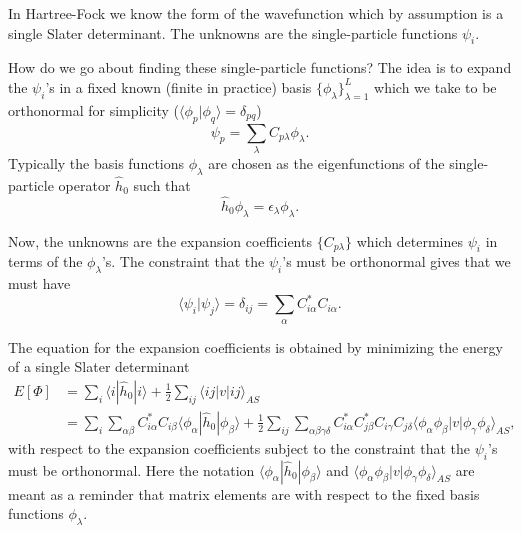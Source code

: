 \documentclass[a4paper,10pt]{article}
\newcommand{\braket}[1]{\langle#1\rangle}
\theoremstyle{definition}
\begin{document}
In Hartree-Fock we know the form of the wavefunction 
which by assumption is a single Slater determinant. The unknowns are the single-particle functions $\psi_i$.

How do we go about finding these single-particle functions? The idea is to expand the $\psi_i$'s in a fixed 
known (finite in practice) basis $\{ \phi_\lambda \}_{\lambda=1}^L$ which we take to be orthonormal for 
simplicity ($\braket{\phi_p|\phi_q} = \delta_{pq}$)
\begin{equation}
 \psi_p = \sum_\lambda C_{p \lambda} \phi_\lambda.
\end{equation}
Typically the basis functions $\phi_\lambda$ are chosen as the eigenfunctions of the single-particle operator $\hat{h}_0$
such that
\begin{equation}
 \hat{h}_0 \phi_\lambda = \epsilon_\lambda \phi_\lambda.
\end{equation}

Now, the unknowns are the expansion coefficients $\{ C_{p\lambda} \}$ which determines $\psi_i$ in terms of 
the $\phi_\lambda$'s. The constraint that the $\psi_i$'s must be orthonormal gives that we must have 
\begin{equation}
 \braket{\psi_i|\psi_j} = \delta_{ij} = \sum_{\alpha} C^*_{i\alpha} C_{i \alpha}. 	
\end{equation}

The equation for the expansion coefficients is obtained by minimizing the energy of a single Slater determinant
\begin{align*}
 E[\Phi] &= \sum_i \braket{i|\hat{h}_0|i} + \frac{1}{2} \sum_{ij} \braket{ij|v|ij}_{AS} \\
 &= \sum_i \sum_{\alpha \beta} C^*_{i \alpha}C_{i \beta} \braket{\phi_\alpha|\hat{h}_0|\phi_\beta} + \frac{1}{2} \sum_{ij} \sum_{\alpha \beta \gamma \delta} C^*_{i \alpha} C^*_{j \beta} C_{i \gamma} C_{j \delta} \braket{\phi_\alpha \phi_\beta|v|\phi_\gamma \phi_\delta}_{AS},
\end{align*}
with respect to the expansion coefficients subject to the constraint that the $\psi_i$'s must be orthonormal. Here the notation 
$\braket{\phi_\alpha|\hat{h}_0|\phi_\beta}$ and $\braket{\phi_\alpha \phi_\beta|v|\phi_\gamma \phi_\delta}_{AS}$ are meant 
as a reminder that matrix elements are with respect to the fixed basis functions $\phi_\lambda$.
\end{document}
